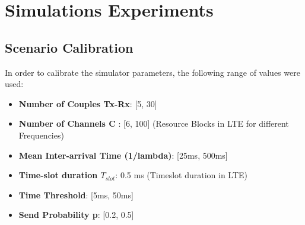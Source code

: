 \section{Simulations Experiments}
\subsection{Scenario Calibration}
In order to calibrate the simulator parameters, the following range of values were used:
\begin{itemize}
	\item \textbf{Number of Couples Tx-Rx}: [5, 30]
	\item \textbf{Number of Channels C} : [6, 100] (Resource Blocks in LTE for different Frequencies)
	\item \textbf{Mean Inter-arrival Time (1/lambda)}: [25ms, 500ms]   
	\item \textbf{Time-slot duration $T_{slot}$}: 0.5 ms (Timeslot duration in LTE)
	\item \textbf{Time Threshold}: [5ms, 50ms] 
	\item \textbf{Send Probability p}: [0.2, 0.5] 
\end{itemize}

